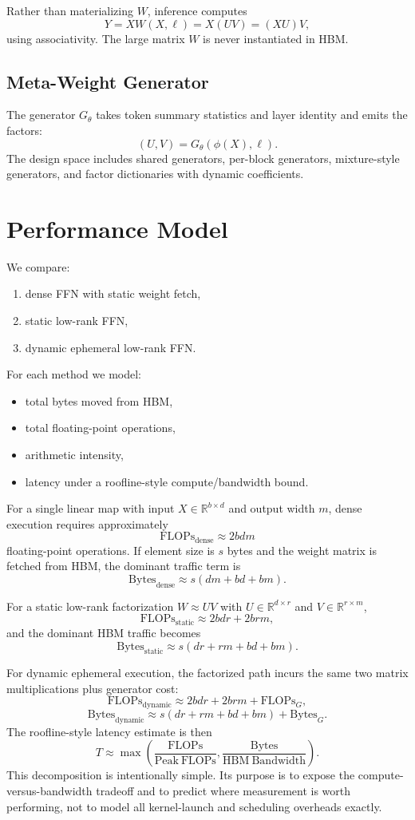 \documentclass[11pt]{article}
\begin{document}
Rather than materializing $W$, inference computes
\[
Y = X W(X,\ell) = X(UV) = (XU)V,
\]
using associativity. The large matrix $W$ is never instantiated in HBM.

\subsection{Meta-Weight Generator}
The generator $G_\theta$ takes token summary statistics and layer identity and emits the factors:
\[
(U,V) = G_\theta(\phi(X), \ell).
\]
The design space includes shared generators, per-block generators, mixture-style generators, and factor dictionaries with dynamic coefficients.

\section{Performance Model}
We compare:
\begin{enumerate}[label=(\alph*)]
\item dense FFN with static weight fetch,
\item static low-rank FFN,
\item dynamic ephemeral low-rank FFN.
\end{enumerate}

For each method we model:
\begin{itemize}
\item total bytes moved from HBM,
\item total floating-point operations,
\item arithmetic intensity,
\item latency under a roofline-style compute/bandwidth bound.
\end{itemize}

For a single linear map with input $X \in \mathbb{R}^{b \times d}$ and output width $m$, dense execution requires approximately
\[
\mathrm{FLOPs}_{\mathrm{dense}} \approx 2bdm
\]
floating-point operations. If element size is $s$ bytes and the weight matrix is fetched from HBM, the dominant traffic term is
\[
\mathrm{Bytes}_{\mathrm{dense}} \approx s(dm + bd + bm).
\]

For a static low-rank factorization $W \approx UV$ with $U \in \mathbb{R}^{d \times r}$ and $V \in \mathbb{R}^{r \times m}$,
\[
\mathrm{FLOPs}_{\mathrm{static}} \approx 2bdr + 2brm,
\]
and the dominant HBM traffic becomes
\[
\mathrm{Bytes}_{\mathrm{static}} \approx s(dr + rm + bd + bm).
\]

For dynamic ephemeral execution, the factorized path incurs the same two matrix multiplications plus generator cost:
\[
\mathrm{FLOPs}_{\mathrm{dynamic}} \approx 2bdr + 2brm + \mathrm{FLOPs}_G,
\]
\[
\mathrm{Bytes}_{\mathrm{dynamic}} \approx s(dr + rm + bd + bm) + \mathrm{Bytes}_G.
\]
The roofline-style latency estimate is then
\[
T \approx \max\!\left(\frac{\mathrm{FLOPs}}{\mathrm{Peak\ FLOPs}}, \frac{\mathrm{Bytes}}{\mathrm{HBM\ Bandwidth}}\right).
\]
This decomposition is intentionally simple. Its purpose is to expose the compute-versus-bandwidth tradeoff and to predict where measurement is worth performing, not to model all kernel-launch and scheduling overheads exactly.
\end{document}
